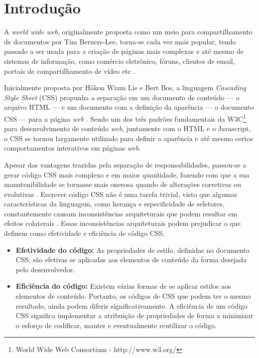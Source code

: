 \chapter{Introdução}
\label{chap:Intr}
A \textit{world wide web}, originalmente proposta como um meio para compartilhamento de documentos por Tim Berners-Lee, torna-se cada vez mais popular, tendo passado a ser usada para a criação de páginas mais complexas e até mesmo de sistemas de informação, como comércio eletrônico, fóruns, clientes de email, portais de compartilhamento de vídeo etc \cite{Berners-Lee:2000:WWO:556560}.

Inicialmente proposta por Håkon Wium Lie e Bert Bos, a linguagem \textit{Cascading Style Sheet} (CSS) propunha a separação em um documento de conteúdo --- o arquivo HTML --- e um documento com a definição da aparência --- o documento CSS --- para a página \textit{web} \cite{Hakon:2005}. Sendo um dos três padrões fundamentais da W3C\footnote{World Wide Web Consortium - http://www.w3.org/} para desenvolvimento de conteúdo \textit{web}, juntamente com o HTML e o Javascript, o CSS se tornou largamente utilizado para definir a aparência e até mesmo certos comportamentos interativos em páginas \textit{web}. 

Apesar das vantagens trazidas pela separação de responsabilidades, passou-se a gerar código CSS mais complexo e em maior quantidade, fazendo com que a sua manutenibilidade se tornasse mais onerosa quando de alterações corretivas ou evolutivas \cite{Mesbah2012}.
Escrever código CSS não é uma tarefa trivial, visto que algumas características da linguagem, como herança e especificidade de seletores, constantemente causam inconsistências arquiteturais que podem resultar em efeitos colaterais \cite{Walton:2015}.
Essas inconsistências arquiteturais podem prejudicar o que  definem como efetividade e eficiência de código CSS.

\begin{itemize}
	\item\textbf{Efetividade do código:} As propriedades de estilo, definidas no documento CSS, são efetivas se aplicadas aos elementos de conteúdo da forma desejada pelo desenvolvedor.
	
	\item\textbf{Eficiência do código:} Existem várias formas de se aplicar estilos aos elementos de conteúdo. Portanto, os códigos de CSS que podem ter o mesmo resultado, ainda podem diferir significativamente. A eficiência de um código CSS significa implementar a atribuição de propriedades de forma a minimizar o esforço de codificar, manter e eventualmente reutilizar o código.
\end{itemize}

